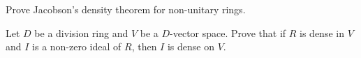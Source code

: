 \begin{bonus}
    Prove Jacobson's density theorem for non-unitary rings. 
\end{bonus}

\begin{exercise}
	\label{xca:ideal_denso}
 Let $D$ be a division ring and $V$ be a $D$-vector space. Prove that 
	if $R$ is dense in $V$ and $I$ is a non-zero ideal of $R$, then 
	$I$ is dense on $V$. 
\end{exercise}






